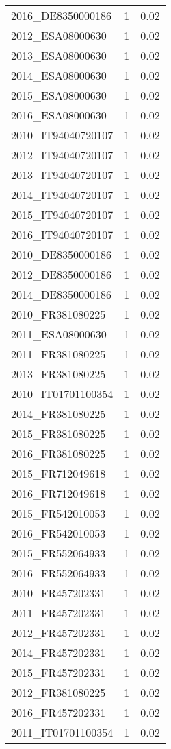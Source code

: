 \begin{table*}[htbp]
\begin{tabular}{lrr}
2016_DE8350000186 & 1 & 0.02 \\
2012_ESA08000630 & 1 & 0.02 \\
2013_ESA08000630 & 1 & 0.02 \\
2014_ESA08000630 & 1 & 0.02 \\
2015_ESA08000630 & 1 & 0.02 \\
2016_ESA08000630 & 1 & 0.02 \\
2010_IT94040720107 & 1 & 0.02 \\
2012_IT94040720107 & 1 & 0.02 \\
2013_IT94040720107 & 1 & 0.02 \\
2014_IT94040720107 & 1 & 0.02 \\
2015_IT94040720107 & 1 & 0.02 \\
2016_IT94040720107 & 1 & 0.02 \\
2010_DE8350000186 & 1 & 0.02 \\
2012_DE8350000186 & 1 & 0.02 \\
2014_DE8350000186 & 1 & 0.02 \\
2010_FR381080225 & 1 & 0.02 \\
2011_ESA08000630 & 1 & 0.02 \\
2011_FR381080225 & 1 & 0.02 \\
2013_FR381080225 & 1 & 0.02 \\
2010_IT01701100354 & 1 & 0.02 \\
2014_FR381080225 & 1 & 0.02 \\
2015_FR381080225 & 1 & 0.02 \\
2016_FR381080225 & 1 & 0.02 \\
2015_FR712049618 & 1 & 0.02 \\
2016_FR712049618 & 1 & 0.02 \\
2015_FR542010053 & 1 & 0.02 \\
2016_FR542010053 & 1 & 0.02 \\
2015_FR552064933 & 1 & 0.02 \\
2016_FR552064933 & 1 & 0.02 \\
2010_FR457202331 & 1 & 0.02 \\
2011_FR457202331 & 1 & 0.02 \\
2012_FR457202331 & 1 & 0.02 \\
2014_FR457202331 & 1 & 0.02 \\
2015_FR457202331 & 1 & 0.02 \\
2012_FR381080225 & 1 & 0.02 \\
2016_FR457202331 & 1 & 0.02 \\
2011_IT01701100354 & 1 & 0.02 \\

\end{tabular}
\end{table*}
